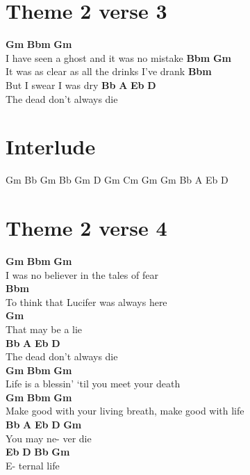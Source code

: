\documentclass{article}
\begin{document}
\section*{Theme 2 verse 3}
\textbf{Gm}            \textbf{Bbm}                    \textbf{Gm}\\
I have seen a ghost and it was no mistake
\textbf{Bbm}                          \textbf{Gm}\\
It was as clear as all the drinks I’ve drank
\textbf{Bbm}\\
But I swear I was dry
\textbf{Bb}         \textbf{A}      \textbf{Eb} \textbf{D}\\
The dead don’t always die

\section*{Interlude}
Gm     Bb
Gm
Bb     Gm
D
Gm     Cm
Gm
Gm
Bb  A  Eb D

\section*{Theme 2 verse 4}
\textbf{Gm}         \textbf{Bbm}           \textbf{Gm}\\
I was no believer in the tales of fear\\
\textbf{Bbm}\\
To think that Lucifer was always here\\
\textbf{Gm}\\
 That may be a lie\\
 \textbf{Bb}         \textbf{A}      \textbf{Eb} \textbf{D}\\
The dead don’t always die\\
\textbf{Gm}        \textbf{Bbm}                         \textbf{Gm}\\
Life is a blessin’ ‘til you meet your death\\
\textbf{Gm}                    \textbf{Bbm}          \textbf{Gm}\\
Make good with your living breath, make good with life\\
\textbf{Bb}  \textbf{A}   \textbf{Eb}  \textbf{D}   \textbf{Gm}\\
You may ne- ver die\\
\textbf{Eb} \textbf{D}  \textbf{Bb}  \textbf{Gm}\\
E- ternal life
\end{document}
